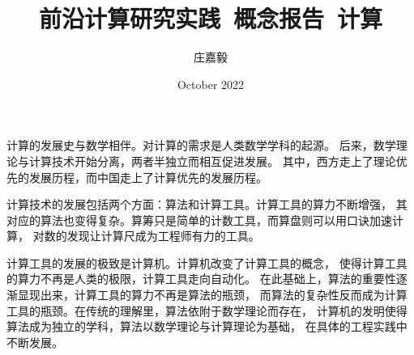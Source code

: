\documentclass{ctexart}
\title{前沿计算研究实践~概念报告~计算}
\author{庄嘉毅}
\date{October 2022}
\begin{document}
\maketitle

计算的发展史与数学相伴。对计算的需求是人类数学学科的起源。
后来，数学理论与计算技术开始分离，两者半独立而相互促进发展。
其中，西方走上了理论优先的发展历程，而中国走上了计算优先的发展历程。

计算技术的发展包括两个方面：算法和计算工具。计算工具的算力不断增强，
其对应的算法也变得复杂。算筹只是简单的计数工具，而算盘则可以用口诀加速计算，
对数的发现让计算尺成为工程师有力的工具。

计算工具的发展的极致是计算机。计算机改变了计算工具的概念，
使得计算工具的算力不再是人类的极限，计算工具走向自动化。
在此基础上，算法的重要性逐渐显现出来，计算工具的算力不再是算法的瓶颈，
而算法的复杂性反而成为计算工具的瓶颈。在传统的理解里，算法依附于数学理论而存在，
计算机的发明使得算法成为独立的学科，算法以数学理论与计算理论为基础，
在具体的工程实践中不断发展。
\end{document}
